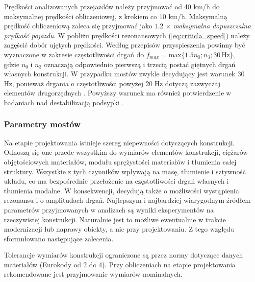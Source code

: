 Prędkości analizowanych przejazdów należy przyjmować od 40 km/h do maksymalnej prędkości obliczeniowej, z krokiem co 10 km/h. Maksymalną prędkość obliczeniową zaleca się przyjmować jako $1.2\,\times\,$\textit{maksymalna dopuszczalna prędkość pojazdu}. W pobliżu prędkości rezonansowych (\ref{eq:criticla_speed}) należy zagęścić dobór ujętych prędkości. Według przepisów \parencite{PKNj,UnionInternationaleDesCheminsDeFer2009} przyspieszenia powinny być wyznaczone w zakresie częstotliwości drgań do $f_{max}=\text{max}\{1.5n_0;n_3; 30\,\text{Hz}\}$, gdzie $n_0$ i $n_3$ oznaczają odpowiednio pierwszą i trzecią postać giętnych drgań własnych konstrukcji. W przypadku mostów zwykle decydujący jest warunek 30 Hz, ponieważ drgania o częstotliwości powyżej 20 Hz dotyczą zazwyczaj elementów drugorzędnych \parencite{Oleszek2015b}. Powyższy warunek ma również potwierdzenie w badaniach nad destabilizacją podsypki \parencite{Zacher2008}.

\subsubsection{Parametry mostów}
Na etapie projektowania istnieje szereg niepewności dotyczących konstrukcji. Odnoszą się one przede wszystkim do wymiarów elementów konstrukcji, ciężarów objętościowych materiałów, modułu sprężystości materiałów i tłumienia całej struktury. Wszystkie z tych czynników wpływają na masę, tłumienie i sztywność układu, co ma bezpośrednie przełożenie na częstotliwości drgań własnych i tłumienia modalne. W konsekwencji, decydują także o możliwości wystąpienia rezonansu i o amplitudach drgań. Najlepszym i najbardziej wiarygodnym źródłem parametrów przyjmowanych w analizach są wyniki eksperymentów na rzeczywistej konstrukcji. Naturalnie jest to możliwe ewentualnie w trakcie modernizacji lub naprawy obiekty, a nie przy projektowaniu. Z tego względu sformułowano następujące zalecenia.

Tolerancje wymiarów konstrukcji ograniczone są przez normy dotyczące danych materiałów (Eurokody od 2 do 4). Przy obliczeniach na etapie projektowania rekomendowane jest przyjmowanie wymiarów nominalnych.

